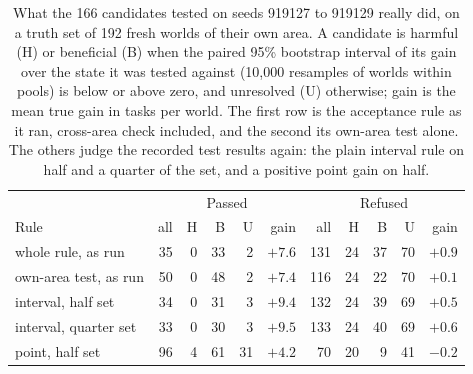 \begin{table}[t]
\centering
\caption{What the 166 candidates tested on seeds 919127 to 919129 really did, on a truth set of 192 fresh worlds of their own area. A candidate is harmful (H) or beneficial (B) when the paired 95\% bootstrap interval of its gain over the state it was tested against (10,000 resamples of worlds within pools) is below or above zero, and unresolved (U) otherwise; gain is the mean true gain in tasks per world. The first row is the acceptance rule as it ran, cross-area check included, and the second its own-area test alone. The others judge the recorded test results again: the plain interval rule on half and a quarter of the set, and a positive point gain on half.}
\label{tab:truth}
\small
\begin{tabular}{lrrrrrrrrrr}
\toprule
 & \multicolumn{5}{c}{Passed} & \multicolumn{5}{c}{Refused} \\
Rule & all & H & B & U & gain & all & H & B & U & gain \\
\midrule
whole rule, as run & 35 & 0 & 33 & 2 & $+7.6$ & 131 & 24 & 37 & 70 & $+0.9$ \\
own-area test, as run & 50 & 0 & 48 & 2 & $+7.4$ & 116 & 24 & 22 & 70 & $+0.1$ \\
interval, half set & 34 & 0 & 31 & 3 & $+9.4$ & 132 & 24 & 39 & 69 & $+0.5$ \\
interval, quarter set & 33 & 0 & 30 & 3 & $+9.5$ & 133 & 24 & 40 & 69 & $+0.6$ \\
point, half set & 96 & 4 & 61 & 31 & $+4.2$ & 70 & 20 & 9 & 41 & $-0.2$ \\
\bottomrule
\end{tabular}
\end{table}
